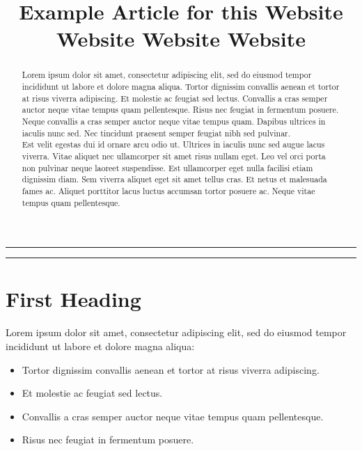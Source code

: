 \documentclass[a4paper]{article}
\title{Example Article for this Website Website Website Website}
\date{}
\begin{document}
\maketitle
\thispagestyle{fancy}

\renewcommand{\abstractname}{\vspace{-\baselineskip}}
\begin{abstract}
Lorem ipsum dolor sit amet, consectetur adipiscing elit, sed do eiusmod tempor incididunt ut labore et dolore magna aliqua. Tortor dignissim convallis aenean et tortor at risus viverra adipiscing. Et molestie ac feugiat sed lectus. Convallis a cras semper auctor neque vitae tempus quam pellentesque. Risus nec feugiat in fermentum posuere. Neque convallis a cras semper auctor neque vitae tempus quam. Dapibus ultrices in iaculis nunc sed. Nec tincidunt praesent semper feugiat nibh sed pulvinar.\\

Est velit egestas dui id ornare arcu odio ut. Ultrices in iaculis nunc sed augue lacus viverra. Vitae aliquet nec ullamcorper sit amet risus nullam eget. Leo vel orci porta non pulvinar neque laoreet suspendisse. Est ullamcorper eget nulla facilisi etiam dignissim diam. Sem viverra aliquet eget sit amet tellus cras. Et netus et malesuada fames ac. Aliquet porttitor lacus luctus accumsan tortor posuere ac. Neque vitae tempus quam pellentesque.
\end{abstract}

\noindent\rule{\textwidth}{0.5pt}
\tableofcontents
\noindent\rule{\textwidth}{0.5pt}
\pagebreak

\section{First Heading}
Lorem ipsum dolor sit amet, consectetur adipiscing elit, sed do eiusmod tempor incididunt ut labore et dolore magna aliqua:
\begin{itemize}
	\item Tortor dignissim convallis aenean et tortor at risus viverra adipiscing.
	\item Et molestie ac feugiat sed lectus.
	\item Convallis a cras semper auctor neque vitae tempus quam pellentesque.
	\item Risus nec feugiat in fermentum posuere.
\end{itemize}
\end{document}
